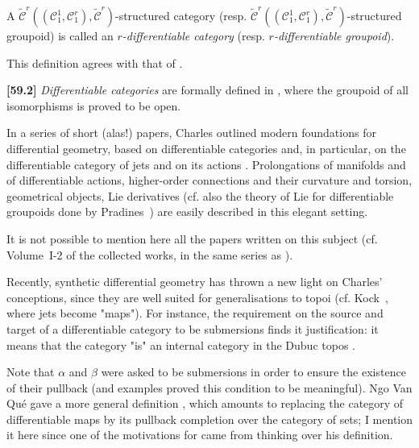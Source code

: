 \documentclass[a4paper,fleqn]{article}
\theoremstyle{plain}
\theoremstyle{definition}
\newenvironment{definition}[1]
  {\renewcommand\theinnerdefinition{#1}\innerdefinition}
  {\endinnerdefinition}
\newenvironment{longcomm}[1]
  {\noindent\textbf{[#1]}\rmfamily}
  {}
\newcommand{\oldpage}[1]{{\marginpar{\footnotesize$\bigg\vert$\,\,\,\,\textit{p.~#1}}}}
\newcommand{\CC}{\mathcal{C}}
\newcommand{\tCC}{\widetilde{\CC}}
\begin{document}
\oldpage{387}

\begin{definition}{8}
\label{definition:ii-8}
  A $\tCC^r((\CC_1^1,\CC_1^r),\tCC^r)$-structured category (resp. $\tCC^r((\CC_1^1,\CC_1^r),\tCC^r)$-structured groupoid) is called an \emph{$r$-differentiable category} (resp. \emph{$r$-differentiable groupoid}).
\end{definition}

This definition agrees with that of \cite{3b}.

\begin{longcomm}{59.2}
  \emph{Differentiable categories} are formally defined in \cite{coll50}, where the groupoid of all isomorphisms is proved to be open.

  In a series of short (alas!) papers, Charles outlined modern foundations for differential geometry, based on differentiable categories and, in particular, on the differentiable category of jets and on its actions \cite{coll46,coll78,coll101,coll103,coll105,coll116}.
  Prolongations of manifolds and of differentiable actions, higher-order connections and their curvature and torsion, geometrical objects, Lie derivatives (cf. also the theory of Lie for differentiable groupoids done by Pradines~\cite{comm85a,comm85b,comm85c,comm85d}) are easily described in this elegant setting.

  It is not possible to mention here all the papers written on this subject (cf. Volume~I-2 of the collected works, in the same series as \cite{coll}).

  Recently, synthetic differential geometry has thrown a new light on Charles' conceptions, since they are well suited for generalisations to topoi (cf. Kock~\cite{comm61}, where jets become "maps").
  For instance, the requirement on the source and target of a differentiable category to be submersions finds it justification: it means that the category "is" an internal category in the Dubuc topos \cite{comm27}.

  Note that $\alpha$ and $\beta$ were asked to be submersions in order to ensure the existence of their pullback (and examples proved this condition to be meaningful).
  Ngo Van Qué gave a more general definition \cite{comm80}, which amounts to replacing the category of differentiable maps by its pullback completion over the category of sets;
  I mention it here since one of the motivations for \cite{coll107} came from thinking over his definition.
\end{longcomm}
\end{document}
